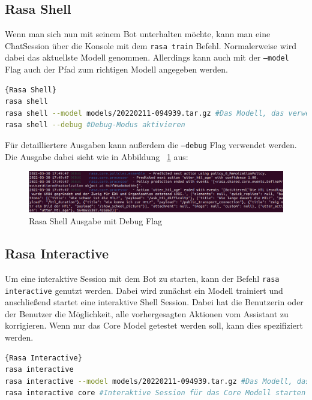 \subsection{Rasa Shell}\label{subsec:rasa-shell}

Wenn man sich nun mit seinem Bot unterhalten möchte, kann man eine ChatSession über die Konsole mit dem \texttt{rasa train} Befehl.
Normalerweise wird dabei das aktuellste Modell genommen.
Allerdings kann auch mit der \texttt{--model} Flag auch der Pfad zum richtigen Modell angegeben werden.

\begin{lstlisting}[language=bash,label={lst:shell-command},caption={Rasa Shell Befehle}]{Rasa Shell}
rasa shell
rasa shell --model models/20220211-094939.tar.gz #Das Modell, das verwendet werden soll
rasa shell --debug #Debug-Modus aktivieren
\end{lstlisting}

Für detailliertere Ausgaben kann außerdem die \texttt{--debug} Flag verwendet werden.
Die Ausgabe dabei sieht wie in Abbildung ~\ref{fig:rasa_shell} aus:

\begin{figure}[hbt!]
    \centering
    \includegraphics[scale=0.40]{pics/rasa_shell}
    \caption{Rasa Shell Ausgabe mit Debug Flag}
    \label{fig:rasa_shell}
\end{figure}

\subsection{Rasa Interactive}\label{subsec:rasa-interactive}

Um eine interaktive Session mit dem Bot zu starten, kann der Befehl \texttt{rasa interactive} genutzt werden.
Dabei wird zunächst ein Modell trainiert und anschließend startet eine interaktive Shell Session.
Dabei hat die Benutzerin oder der Benutzer die Möglichkeit, alle vorhergesagten Aktionen vom Assistant zu korrigieren.
Wenn nur das Core Model getestet werden soll, kann dies spezifiziert werden.

\begin{lstlisting}[language=bash,label={lst:interactive-command},caption={Interaktive Trainingssession starten}]{Rasa Interactive}
rasa interactive
rasa interactive --model models/20220211-094939.tar.gz #Das Modell, das verwendet werden soll
rasa interactive core #Interaktive Session für das Core Modell starten
\end{lstlisting}

